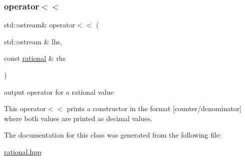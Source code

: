 \subsubsection{\texorpdfstring{operator$<$$<$}{operator<<}}
{\footnotesize\ttfamily std\+::ostream\& operator$<$$<$ (\begin{DoxyParamCaption}\item[{std\+::ostream \&}]{lhs,  }\item[{const \hyperlink{classrational}{rational} \&}]{rhs }\end{DoxyParamCaption})\hspace{0.3cm}{\ttfamily [friend]}}



output operator for a rational value 

This operator$<$$<$ prints a constructor in the format \mbox{[}counter/denominator\mbox{]} where both values are printed as decimal values. 

The documentation for this class was generated from the following file\+:\begin{DoxyCompactItemize}
\item 
\hyperlink{rational_8hpp}{rational.\+hpp}\end{DoxyCompactItemize}
